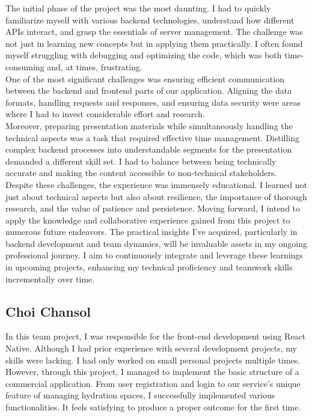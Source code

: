 \documentclass[conference]{IEEEtran}
\begin{document}
The initial phase of the project was the most daunting. I had to quickly familiarize myself with various backend technologies, understand how different APIs interact, and grasp the essentials of server management. The challenge was not just in learning new concepts but in applying them practically. I often found myself struggling with debugging and optimizing the code, which was both time-consuming and, at times, frustrating. \\

One of the most significant challenges was ensuring efficient communication between the backend and frontend parts of our application. Aligning the data formats, handling requests and responses, and ensuring data security were areas where I had to invest considerable effort and research. \\

Moreover, preparing presentation materials while simultaneously handling the technical aspects was a task that required effective time management. Distilling complex backend processes into understandable segments for the presentation demanded a different skill set. I had to balance between being technically accurate and making the content accessible to non-technical stakeholders. \\

Despite these challenges, the experience was immensely educational. I learned not just about technical aspects but also about resilience, the importance of thorough research, and the value of patience and persistence. Moving forward, I intend to apply the knowledge and collaborative experience gained from this project to numerous future endeavors. The practical insights I've acquired, particularly in backend development and team dynamics, will be invaluable assets in my ongoing professional journey. I aim to continuously integrate and leverage these learnings in upcoming projects, enhancing my technical proficiency and teamwork skills incrementally over time. \\

\subsection{Choi Chansol}
In this team project, I was responsible for the front-end development using React Native. Although I had prior experience with several development projects, my skills were lacking. I had only worked on small personal projects multiple times. However, through this project, I managed to implement the basic structure of a commercial application. From user registration and login to our service's unique feature of managing hydration spaces, I successfully implemented various functionalities. It feels satisfying to produce a proper outcome for the first time.\\
\end{document}
